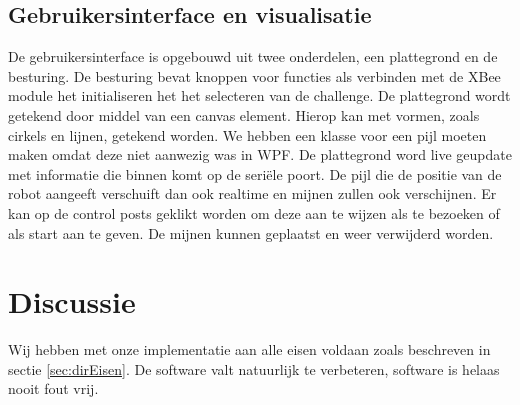 \documentclass{report}
\begin{document}
\subsection{Gebruikersinterface en visualisatie}
De gebruikersinterface is opgebouwd uit twee onderdelen, een plattegrond en de besturing.
De besturing bevat knoppen voor functies als verbinden met de XBee module het initialiseren het het selecteren van de challenge.
De plattegrond wordt getekend door middel van een canvas element.
Hierop kan met vormen, zoals cirkels en lijnen, getekend worden. We hebben een klasse voor een pijl moeten maken omdat deze niet aanwezig was in WPF.
De plattegrond word live geupdate met informatie die binnen komt op de seriële poort. De pijl die de positie van de robot aangeeft verschuift dan ook realtime en mijnen zullen ook verschijnen.
Er kan op de control posts geklikt worden om deze aan te wijzen als te bezoeken of als start aan te geven.
De mijnen kunnen geplaatst en weer verwijderd worden.

\section{Discussie}
Wij hebben met onze implementatie aan alle eisen voldaan zoals beschreven in sectie \ref{sec:dirEisen}. De software valt natuurlijk te verbeteren, software is helaas nooit fout vrij.
\end{document}
